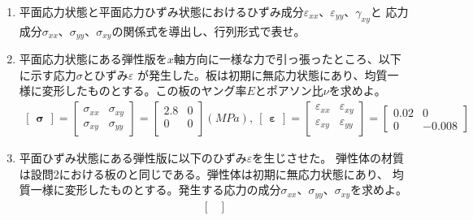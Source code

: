 {  \begin{enumerate}[label = \arabic*.]
    \item 平面応力状態と平面応力ひずみ状態におけるひずみ成分$\varepsilon_{xx}$、$\varepsilon_{yy}$、$\gamma_{xy}$と
          応力成分$\sigma_{xx}$、$\sigma_{yy}$、$\sigma_{xy}$の関係式を導出し、行列形式で表せ。
    \item 平面応力状態にある弾性版を$x$軸方向に一様な力で引っ張ったところ、以下に示す応力$\sigma$とひずみ$\varepsilon$
          が発生した。板は初期に無応力状態にあり、均質一様に変形したものとする。この板のヤング率$E$とポアソン比$\nu$を求めよ。
          \begin{align*}%
            \begin{bmatrix}
              \bm \sigma
            \end{bmatrix}
            =
            \begin{bmatrix}
              \sigma_{xx}&\sigma_{xy}\\
              \sigma_{xy}&\sigma_{yy}
            \end{bmatrix}
            =
            \begin{bmatrix}
              2.8&0\\
              0&0\\
            \end{bmatrix}
            (\si{MPa}),\:
            \begin{bmatrix}
              \bm \varepsilon
            \end{bmatrix}
            =
            \begin{bmatrix}
              \varepsilon_{xx}&\varepsilon_{xy}\\
              \varepsilon_{xy}&\varepsilon_{yy}\\
            \end{bmatrix}
            =
            \begin{bmatrix}
              0.02&0\\
              0&-0.008
            \end{bmatrix}
          \end{align*}
    \item 平面ひずみ状態にある弾性版に以下のひずみ$\varepsilon$を生じさせた。
          弾性体の材質は設問2における板のと同じである。弾性体は初期に無応力状態にあり、
          均質一様に変形したものとする。発生する応力の成分$\sigma_{xx}$、$\sigma_{yy}$、$\sigma_{xy}$を求めよ。
          \begin{align*}%
            \begin{bmatrix}

\end{bmatrix}
\end{align*}
\end{enumerate}}
